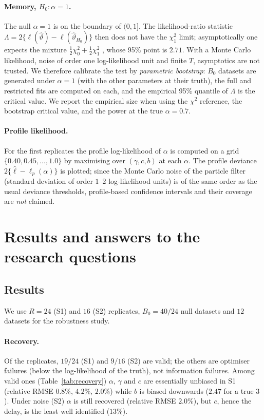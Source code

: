 \documentclass[10pt,a4paper]{article}
\begin{document}
\paragraph{Memory, $H_0:\alpha=1$.}
The null $\alpha=1$ is on the boundary of $(0,1]$. The likelihood-ratio statistic $\Lambda=2\{\ell(\hat\vartheta)-\ell(\hat\vartheta_{H_0})\}$ then does not have the $\chi^2_1$ limit; asymptotically one expects the mixture $\tfrac12\chi^2_0+\tfrac12\chi^2_1$ \citep{Chernoff1954,SelfLiang1987}, whose 95\% point is $2.71$. With a Monte Carlo likelihood, noise of order one log-likelihood unit and finite $T$, asymptotics are not trusted. We therefore calibrate the test by \emph{parametric bootstrap}: $B_0$ datasets are generated under $\alpha=1$ (with the other parameters at their truth), the full and restricted fits are computed on each, and the empirical 95\% quantile of $\Lambda$ is the critical value. We report the empirical size when using the $\chi^2$ reference, the bootstrap critical value, and the power at the true $\alpha=0.7$.

\paragraph{Profile likelihood.}
For the first replicates the profile log-likelihood of $\alpha$ is computed on a grid $\{0.40,0.45,\dots,1.0\}$ by maximising over $(\gamma,c,b)$ at each $\alpha$. The profile deviance $2\{\hat\ell-\ell_p(\alpha)\}$ is plotted; since the Monte Carlo noise of the particle filter (standard deviation of order $1$--$2$ log-likelihood units) is of the same order as the usual deviance thresholds, profile-based confidence intervals and their coverage are \emph{not} claimed.

\section{Results and answers to the research questions}\label{sec:results}
\subsection{Results}
We use $R=24$ (S1) and $16$ (S2) replicates, $B_0=40/24$ null datasets and $12$ datasets for the robustness study.

\paragraph{Recovery.} Of the replicates, $19/24$ (S1) and $9/16$ (S2) are valid; the others are optimiser failures (below the log-likelihood of the truth), not information failures. Among valid ones (Table~\ref{tab:recovery}) $\alpha$, $\gamma$ and $c$ are essentially unbiased in S1 (relative RMSE $0.8\%$, $4.2\%$, $2.0\%$) while $b$ is biased downwards ($2.47$ for a true $3$). Under noise (S2) $\alpha$ is still recovered (relative RMSE $2.0\%$), but $c$, hence the delay, is the least well identified ($13\%$).
\end{document}
